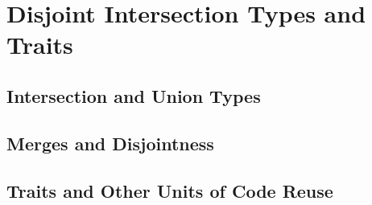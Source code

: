 \chapter{Disjoint Intersection Types and Traits} \label{ch:background}

\section{Intersection and Union Types}

\section{Merges and Disjointness}

\section{Traits and Other Units of Code Reuse}
